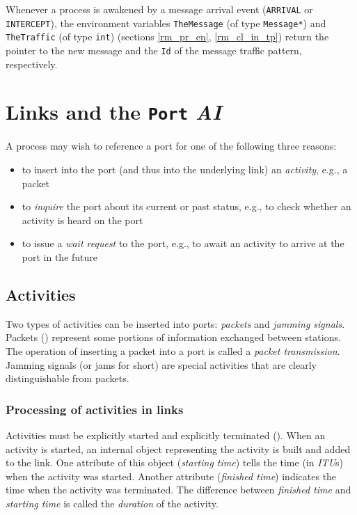 Whenever a process is
awakened by a message arrival event ({\tt ARRIVAL} or {\tt INTERCEPT}),
the environment variables
{\tt TheMessage} (of type {\tt Message*}) and {\tt TheTraffic}
(of type {\tt int})
(sections \ref{rm_pr_en}, \ref{rm_cl_in_tp})
return the pointer to the new message
and the {\tt Id} of the message traffic pattern, respectively.


\section{Links and the {\tt Port} {\em AI\/}}
\label{rm_po}

A process may wish to reference a port for one of the following three reasons:
\begin{itemize}
\item
to insert into the port (and thus into the underlying link) an {\em activity},
e.g., a packet
\item
to {\em inquire\/} the port about its current or past status, e.g., to
check whether an activity is heard on the port
\item
to issue a {\em wait request\/} to the port, e.g., to await an activity to
arrive at the port in the future
\end{itemize}

\subsection{Activities}
\label{rm_po_ac}

Two types of activities can be inserted into ports:
{\em packets\/} and {\em jamming signals}.
Packets () represent some portions of information exchanged
between stations.
The operation of inserting a packet into a port is called a
{\em packet transmission}.
Jamming signals (or jams for short) are special activities that are
clearly distinguishable from packets.

\subsubsection{Processing of activities in links}
\label{rm_po_ac_pr}

Activities must be explicitly started
and explicitly terminated ().
When an activity is started, an internal object representing the activity
is built and added to the link.
One attribute of this object ({\em starting time\/})
tells the time (in {\em ITU\/}s) when the activity was started.
Another attribute ({\em finished time\/})
indicates the time when the activity was terminated.
The difference between {\em finished time\/} and {\em starting time\/} is
called the {\em duration\/} of the activity.

